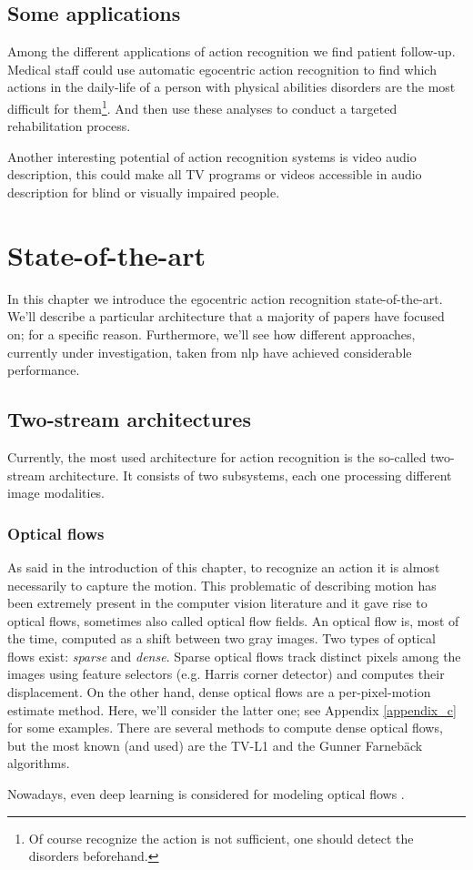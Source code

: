 \documentclass[12pt, a4paper]{report}
\begin{document}
				\subsection*{Some applications}
					Among the different applications of action recognition we find patient follow-up.
					Medical staff could use automatic egocentric action recognition to find which actions in the daily-life of a person with physical abilities disorders are the most difficult for them\footnote{Of course recognize the action is not sufficient, one should detect the disorders beforehand.}.
					And then use these analyses to conduct a targeted rehabilitation process.
					\par
					Another interesting potential of action recognition systems is video audio description, this could make all TV programs or videos accessible in audio description for blind or visually impaired people.
		\section{State-of-the-art}
			In this chapter we introduce the egocentric action recognition state-of-the-art.
			We'll describe a particular architecture that a majority of papers have focused on; for a specific reason.
			Furthermore, we'll see how different approaches, currently under investigation, taken from \gls{nlp} have achieved considerable performance.
			\subsection{Two-stream architectures}\label{twostream}
				Currently, the most used architecture for action recognition is the so-called two-stream architecture.
				It consists of two subsystems, each one processing different image modalities.
				\subsubsection{Optical flows}
					As said in the introduction of this chapter, to recognize an action it is almost necessarily to capture the motion.
					This problematic of describing motion has been extremely present in the computer vision literature and it gave rise to optical flows, sometimes also called optical flow fields.
					An optical flow is, most of the time, computed as a shift between two gray images.
					Two types of optical flows exist: {\itshape sparse} and {\itshape dense}.
					Sparse optical flows track distinct pixels among the images using feature selectors (e.g. Harris corner detector) and computes their displacement.
					On the other hand, dense optical flows are a per-pixel-motion estimate method.
					Here, we'll consider the latter one; see Appendix \ref{appendix_c} for some examples.
					There are several methods to compute dense optical flows, but the most known (and used) are the TV-L1 \cite{perez2013tv} and the Gunner Farnebäck \cite{farneback2003two} algorithms.
					\par
					Nowadays, even deep learning is considered for modeling optical flows \cite{hur2020optical}.
\end{document}
